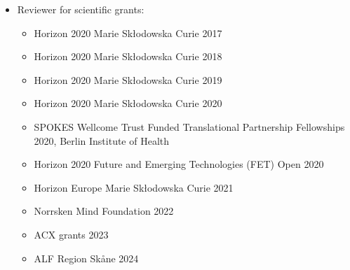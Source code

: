 \documentclass[10pt,a4paper,twocolumn]{article}
\begin{document}
\begin{itemize}
\begin{itemize}
    
        
        \item The Review of Psychology
        
    
    \end{itemize}
    
    \par{\small Verified in Web of Science (Reviewer Recognition Service, ID: 1550920)}

    \item Reviewer for scientific grants:
    
    \begin{itemize}
    
        
        \item Horizon 2020 Marie Skłodowska Curie 2017
        
    
        
        \item Horizon 2020 Marie Skłodowska Curie 2018
        
    
        
        \item Horizon 2020 Marie Skłodowska Curie 2019
        
    
        
        \item Horizon 2020 Marie Skłodowska Curie 2020
        
    
        
        \item SPOKES Wellcome Trust Funded Translational Partnership Fellowships 2020, Berlin Institute of Health
        
    
        
        \item Horizon 2020 Future and Emerging Technologies (FET) Open 2020
        
    
        
        \item Horizon Europe Marie Skłodowska Curie 2021
        
    
        
        \item Norrsken Mind Foundation 2022
        
    
        
        \item ACX grants 2023
        
    
        
        \item ALF Region Skåne 2024
        

\end{itemize}
\end{itemize}
\end{document}

